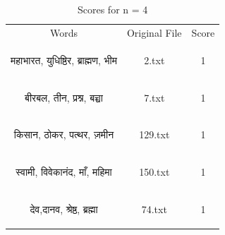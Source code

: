 \documentclass[12pt]{article}
\begin{document}
	\begin{table}
		\centering
		\begin{tabular}{|c|c|c|}
			\hline	
			Words & Original File & Score\\
			\begin{sanskrit}
				महाभारत, युधिष्ठिर, ब्राह्मण, भीम
			\end{sanskrit} & 2.txt & 1\\
			\begin{sanskrit}
				बीरबल, तीन, प्रश्न, बच्चा
			\end{sanskrit} & 7.txt & 1\\
			\begin{sanskrit}
				किसान, ठोकर, पत्थर, ज़मीन 
			\end{sanskrit} & 129.txt & 1 \\
			\begin{sanskrit}
				स्वामी, विवेकानंद, माँ, महिमा
			\end{sanskrit} & 150.txt & 1\\
			\begin{sanskrit}
				देव,दानव, श्रेष्ठ, ब्रह्मा
			\end{sanskrit} & 74.txt & 1\\
			\hline
		\end{tabular}
		\caption{Scores for n = 4}
	\end{table}
\end{document}
